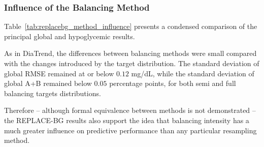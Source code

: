 \subsubsection{Influence of the Balancing Method}
\label{subsubsec:replacebg_method_influence}

Table~\ref{tab:replacebg_method_influence} presents a condensed comparison of the principal global and hypoglycemic results.

\begin{table}[htbp]
    \centering
    \caption{Main REPLACE-BG results.}
    \label{tab:replacebg_method_influence}
\end{table}

As in DiaTrend, the differences between balancing methods were small compared with the changes introduced by the target distribution. The standard deviation of global RMSE remained at or below \(0.12\) mg/dL, while the standard deviation of global A+B remained below \(0.05\) percentage points, for both semi and full balancing targets distributions.

Therefore -- although formal equivalence between methods is not demonstrated -- the REPLACE-BG results also support the idea that balancing intensity has a much greater influence on predictive performance than any particular resampling method.

